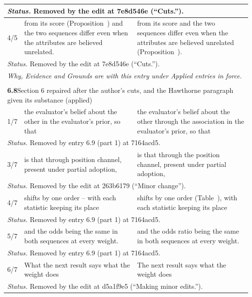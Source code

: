 \documentclass[10pt]{article}
\theoremstyle{definition}
\renewcommand{\ref}[1]{\textsc{\detokenize{#1}}}
\newlength{\fullw}\setlength{\fullw}{25.9cm}
\newcommand{\entryhead}[2]{\multicolumn{3}{|l|}{\rule{0pt}{2.6ex}\large\textbf{#1}\quad #2} \\ \hline}
\begin{document}
{\begin{longtable}{|p{0.9cm}|p{12.2cm}|p{12.2cm}|}
\multicolumn{3}{|p{\fullw}|}{\textit{Status.} Removed by the edit at 7e8d546e (``Cuts.'').} \\ \hline
4/5 & from its score (Proposition~\ref{prop:ADJ}) and the two sequences differ even when the attributes are believed unrelated. & from its score and the two sequences differ even when the attributes are believed unrelated (Proposition~\ref{prop:LAD}). \\ \hline
\multicolumn{3}{|p{\fullw}|}{\textit{Status.} Removed by the edit at 7e8d546e (``Cuts.'').} \\ \hline
\multicolumn{3}{|p{\fullw}|}{\textit{Why, Evidence and Grounds are with this entry under Applied entries in force.}} \\ \hline
\multicolumn{3}{|l|}{} \\ \hline
\entryhead{6.8}{Section 6 repaired after the author's cuts, and the Hawthorne paragraph given its substance (applied)\quad{\footnotesize\textit{(formerly C.26)}}}
1/7 & the evaluator's belief about the other in the evaluator's prior, so that & the evaluator's belief about the other through the association in the evaluator's prior, so that \\ \hline
\multicolumn{3}{|p{\fullw}|}{\textit{Status.} Removed by entry 6.9 (part 1) at 7164acd5.} \\ \hline
3/7 & is that through position channel, present under partial adoption, & is that through the position channel, present under partial adoption, \\ \hline
\multicolumn{3}{|p{\fullw}|}{\textit{Status.} Removed by the edit at 263b6179 (``Minor change'').} \\ \hline
4/7 & shifts by one order -- with each statistic keeping its place & shifts by one order (Table~\ref{tab:robust}), with each statistic keeping its place \\ \hline
\multicolumn{3}{|p{\fullw}|}{\textit{Status.} Removed by entry 6.9 (part 1) at 7164acd5.} \\ \hline
5/7 & and the odds being the same in both sequences at every weight. & and the odds ratio being the same in both sequences at every weight. \\ \hline
\multicolumn{3}{|p{\fullw}|}{\textit{Status.} Removed by entry 6.9 (part 1) at 7164acd5.} \\ \hline
6/7 & What the next result says what the weight does & The next result says what the weight does \\ \hline
\multicolumn{3}{|p{\fullw}|}{\textit{Status.} Removed by the edit at d5a1f9e5 (``Making minor edits.'').} \\ \hline

\end{longtable}}
\end{document}
